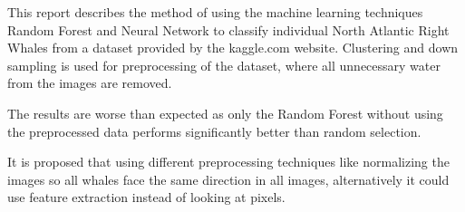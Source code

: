 This report describes the method of using the machine learning techniques Random Forest and Neural Network to classify individual North Atlantic Right Whales from a dataset provided by the kaggle.com website. Clustering and down sampling is used for preprocessing of the dataset, where all unnecessary water from the images are removed.

The results are worse than expected as only the Random Forest without using the preprocessed data performs significantly better than random selection. 

It is proposed that using different preprocessing techniques like normalizing the images so all whales face the same direction in all images, alternatively it could use feature extraction instead of looking at pixels.


